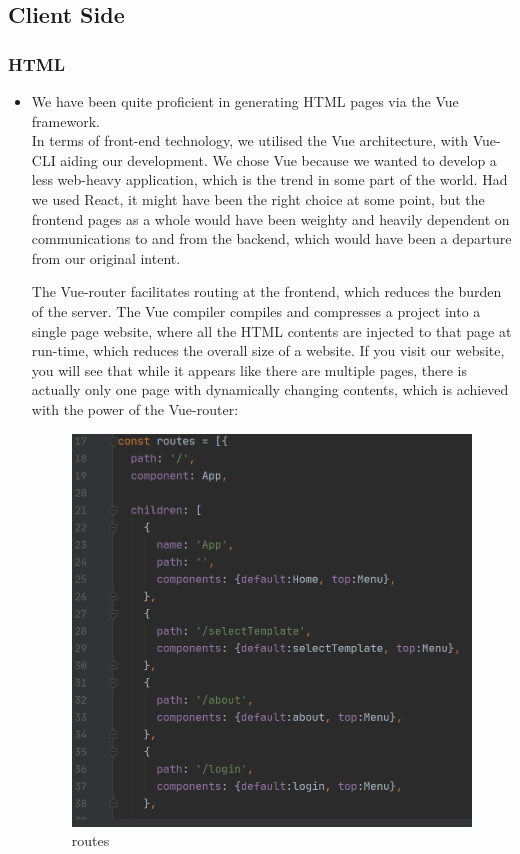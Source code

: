 \documentclass[11pt]{article}
\begin{document}
\begin{spacing}{1.0}
	\subsection{Client Side}
	\subsubsection{HTML}
	\begin{itemize}
  		\item We have been quite proficient in generating HTML pages via the Vue framework. \\

	\hspace{\parindent}In terms of front-end technology, we utilised the Vue architecture, with Vue-CLI aiding our development. We chose Vue because we wanted to develop a less web-heavy application, which is the trend in some part of the world. Had we used React, it might have been the right choice at some point, but the frontend pages as a whole would have been weighty and heavily dependent on communications to and from the backend, which would have been a departure from our original intent.
	
	\hspace{\parindent}The Vue-router facilitates routing at the frontend, which reduces the burden of the server.
The Vue compiler compiles and compresses a project into a single page website, where all the HTML contents are injected to that page at run-time, which reduces the overall size of a website. 
	If you visit our website, you will see that while it appears like there are multiple pages, there is actually only one page with dynamically changing contents, which is achieved with the power of the Vue-router:
	\begin{figure}[H]
	\centering
	\includegraphics[scale=.3]{figures/routes.png}
	\caption{routes}
	\label{fig:8}
\end{figure}
	

\end{itemize}
\end{spacing}
\end{document}
